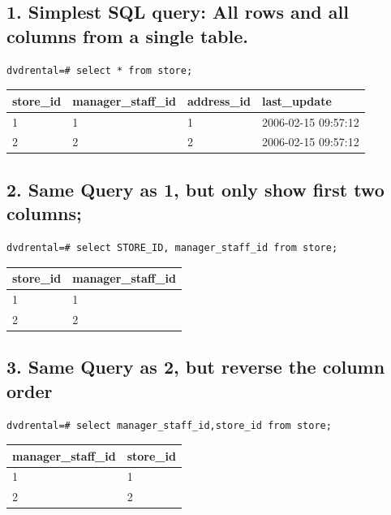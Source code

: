 \documentclass[]{book}
\theoremstyle{definition}
\theoremstyle{definition}
\theoremstyle{definition}
\theoremstyle{remark}
\begin{document}
\hypertarget{simplest-sql-query-all-rows-and-all-columns-from-a-single-table.}{%
\subsection{1. Simplest SQL query: All rows and all columns from a
single
table.}\label{simplest-sql-query-all-rows-and-all-columns-from-a-single-table.}}

\begin{verbatim}
dvdrental=# select * from store;  
\end{verbatim}

\begin{longtable}[]{@{}llll@{}}
\toprule
store\_id & manager\_staff\_id & address\_id &
last\_update\tabularnewline
\midrule
\endhead
1 & 1 & 1 & 2006-02-15 09:57:12\tabularnewline
2 & 2 & 2 & 2006-02-15 09:57:12\tabularnewline
\bottomrule
\end{longtable}

\hypertarget{same-query-as-1-but-only-show-first-two-columns}{%
\subsection{2. Same Query as 1, but only show first two
columns;}\label{same-query-as-1-but-only-show-first-two-columns}}

\begin{verbatim}
dvdrental=# select STORE_ID, manager_staff_id from store;                
\end{verbatim}

\begin{longtable}[]{@{}ll@{}}
\toprule
store\_id & manager\_staff\_id\tabularnewline
\midrule
\endhead
1 & 1\tabularnewline
2 & 2\tabularnewline
\bottomrule
\end{longtable}

\hypertarget{same-query-as-2-but-reverse-the-column-order}{%
\subsection{3. Same Query as 2, but reverse the column
order}\label{same-query-as-2-but-reverse-the-column-order}}

\begin{verbatim}
dvdrental=# select manager_staff_id,store_id from store;
\end{verbatim}

\begin{longtable}[]{@{}ll@{}}
\toprule
manager\_staff\_id & store\_id\tabularnewline
\midrule
\endhead
1 & 1\tabularnewline
2 & 2\tabularnewline
\bottomrule
\end{longtable}
\end{document}
